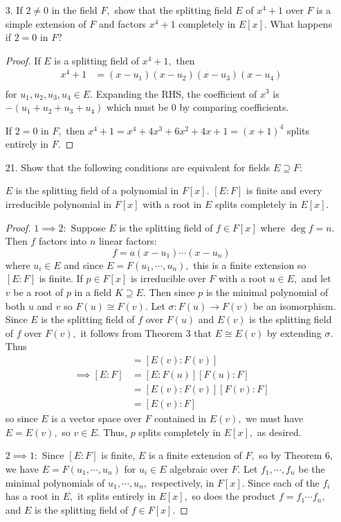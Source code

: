 \documentclass{article}
\begin{document}
\begin{itemize}
	\item[3.] If $2\neq 0$ in the field $F,$ show that the splitting field $E$ of $x^4+1$ over $F$ is a simple extension of $F$ and factors $x^4+1$ completely in $E[x].$ What happens if $2=0$ in $F?$
		\begin{proof}
			If $E$ is a splitting field of $x^4+1,$ then 
			\begin{align*}
				x^4+1&=(x-u_1)(x-u_2)(x-u_3)(x-u_4) \\
			\end{align*}
			for $u_1, u_2, u_3, u_4\in E.$ Expanding the RHS, the coefficient of $x^3$ is $-(u_1+u_2+u_3+u_4)$ which must be 0 by comparing coefficients. 

			If $2=0$ in $F,$ then $x^4+1=x^4+4x^3+6x^2+4x+1=(x+1)^4$ splits entirely in $F.$
		\end{proof}

	\item[21.] Show that the following conditions are equivalent for fields $E\supseteq F:$
		\begin{enumerate}[1.]
				\ii $E$ is the splitting field of a polynomial in $F[x].$
				\ii $[E:F]$ is finite and every irreducible polynomial in $F[x]$ with a root in $E$ splits completely in $E[x].$ 
		\end{enumerate}
		\begin{proof}
			$1\implies 2:$ Suppose $E$ is the splitting field of $f\in F[x]$ where $\deg f=n.$ Then $f$ factors into $n$ linear factors:
			\[f=a(x-u_1)\cdots(x-u_n)\]
			where $u_i\in E$ and since $E=F(u_1, \cdots, u_n),$ this is a finite extension so $[E:F]$ is finite. If $p\in F[x]$ is irreducible over $F$ with a root $u\in E,$ and let $v$ be a root of $p$ in a field $K\supseteq E.$ Then since $p$ is the minimal polynomial of both $u$ and $v$ so $F(u)\cong F(v).$ Let $\sigma:F(u)\to F(v)$ be an isomorphism. Since $E$ is the splitting field of $f$ over $F(u)$ and $E(v)$ is the splitting field of $f$ over $F(v),$ it follows from Theorem 3 that $E\cong E(v)$ by extending $\sigma.$ Thus
			\begin{align*}
				[E:F(u)] &= [E(v):F(v)] \\
				\implies [E:F] &= [E:F(u)][F(u):F] \\
				&= [E(v):F(v)][F(v):F] \\
				&= [E(v):F]
			\end{align*}
			so since $E$ is a vector space over $F$ contained in $E(v),$ we must have $E=E(v),$ so $v\in E.$ Thus, $p$ splits completely in $E[x],$ as desired.

			$2\implies 1:$ Since $[E:F]$ is finite, $E$ is a finite extension of $F,$ so by Theorem 6, we have $E=F(u_1, \cdots, u_n)$ for $u_i\in E$ algebraic over $F.$ Let $f_1, \cdots, f_n$ be the minimal polynomials of $u_1, \cdots, u_n,$ respectively, in $F[x].$ Since each of the $f_i$ has a root in $E,$ it splits entirely in $E[x],$ so does the product $f=f_1\cdots f_n,$ and $E$ is the splitting field of $f\in F[x].$ 
		\end{proof}
		
\end{itemize}
\end{document}
